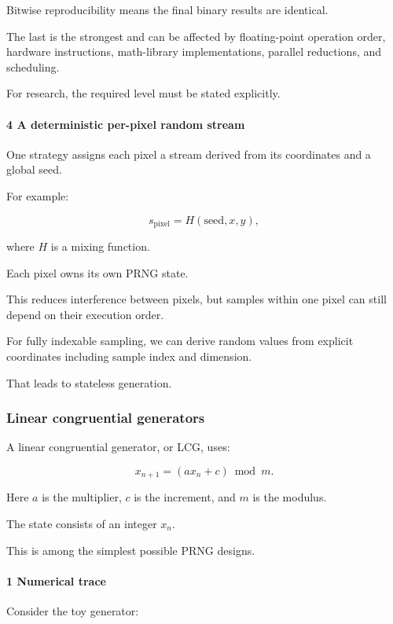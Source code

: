 Bitwise reproducibility means the final binary results are identical.

The last is the strongest and can be affected by floating-point operation order, hardware instructions, math-library implementations, parallel reductions, and scheduling.

For research, the required level must be stated explicitly.

\paragraph{4 A deterministic per-pixel random stream}\label{a-deterministic-per-pixel-random-stream}

One strategy assigns each pixel a stream derived from its coordinates and a global seed.

For example:

\[
 s_{\mathrm{pixel}}= H(\text{seed},x,y),
\]

where \(H\) is a mixing function.

Each pixel owns its own PRNG state.

This reduces interference between pixels, but samples within one pixel can still depend on their execution order.

For fully indexable sampling, we can derive random values from explicit coordinates including sample index and dimension.

That leads to stateless generation.

\subsubsection{Linear congruential generators}\label{linear-congruential-generators}

A linear congruential generator, or LCG, uses:

\[
 \boxed{ x_{n+1}=(ax_n+c)\bmod m }.
\]

Here \(a\) is the multiplier, \(c\) is the increment, and \(m\) is the modulus.

The state consists of an integer \(x_n\).

This is among the simplest possible PRNG designs.

\paragraph{1 Numerical trace}\label{numerical-trace}

Consider the toy generator:

